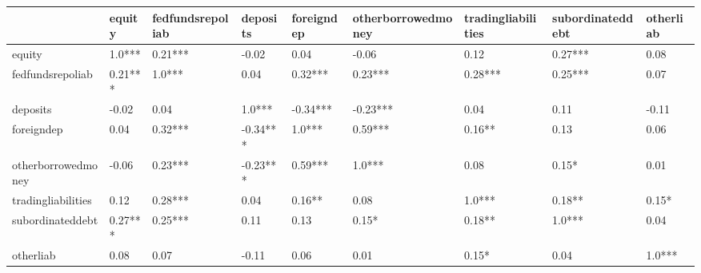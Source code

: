 \begin{tabular}{lllllllll}
\toprule
{} &   equity & fedfundsrepoliab &  deposits & foreigndep & otherborrowedmoney & tradingliabilities & subordinateddebt & otherliab \\
\midrule
equity             &   1.0*** &          0.21*** &     -0.02 &       0.04 &              -0.06 &               0.12 &          0.27*** &      0.08 \\
fedfundsrepoliab   &  0.21*** &           1.0*** &      0.04 &    0.32*** &            0.23*** &            0.28*** &          0.25*** &      0.07 \\
deposits           &    -0.02 &             0.04 &    1.0*** &   -0.34*** &           -0.23*** &               0.04 &             0.11 &     -0.11 \\
foreigndep         &     0.04 &          0.32*** &  -0.34*** &     1.0*** &            0.59*** &             0.16** &             0.13 &      0.06 \\
otherborrowedmoney &    -0.06 &          0.23*** &  -0.23*** &    0.59*** &             1.0*** &               0.08 &            0.15* &      0.01 \\
tradingliabilities &     0.12 &          0.28*** &      0.04 &     0.16** &               0.08 &             1.0*** &           0.18** &     0.15* \\
subordinateddebt   &  0.27*** &          0.25*** &      0.11 &       0.13 &              0.15* &             0.18** &           1.0*** &      0.04 \\
otherliab          &     0.08 &             0.07 &     -0.11 &       0.06 &               0.01 &              0.15* &             0.04 &    1.0*** \\
\bottomrule
\end{tabular}
